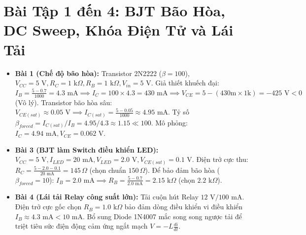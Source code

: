 \documentclass[12pt,a4paper]{report}
\begin{document}
\section{Bài Tập 1 đến 4: BJT Bão Hòa, DC Sweep, Khóa Điện Tử và Lái Tải}
\begin{itemize}
    \item \textbf{Bài 1 (Chế độ bão hòa):} Transistor 2N2222 ($\beta = 100$), $V_{CC} = 5\text{ V}, R_C = 1\text{ k}\Omega, R_B = 1\text{ k}\Omega, V_{in} = 5\text{ V}$.
    Giả thiết khuếch đại: $I_B = \frac{5 - 0.7}{1000} = 4.3\text{ mA} \implies I_C = 100 \times 4.3 = 430\text{ mA} \implies V_{CE} = 5 - (430\text{m} \times 1\text{k}) = -425\text{ V} < 0$ (Vô lý).
    Transistor bão hòa sâu: $V_{CE(sat)} \approx 0.05\text{ V} \implies I_{C(sat)} = \frac{5 - 0.05}{1000} \approx 4.95\text{ mA}$. Tỷ số $\beta_{forced} = I_{C(sat)}/I_B = 4.95/4.3 \approx 1.15 \ll 100$. Mô phỏng: $I_C = 4.94\text{ mA}, V_{CE} = 0.062\text{ V}$.
    \item \textbf{Bài 3 (BJT làm Switch điều khiển LED):} $V_{CC} = 5\text{ V}, I_{LED} = 20\text{ mA}, V_{LED} = 2.0\text{ V}, V_{CE(sat)} = 0.1\text{ V}$.
    Điện trở cực thu: $R_C = \frac{5 - 2.0 - 0.1}{20\text{ mA}} = 145\,\Omega$ (chọn chuẩn $150\,\Omega$).
    Để bảo đảm bão hòa ($\beta_{forced} = 10$): $I_B = 2.0\text{ mA} \implies R_B = \frac{5 - 0.7}{2.0\text{ mA}} = 2.15\text{ k}\Omega$ (chọn $2.2\text{ k}\Omega$).
    \item \textbf{Bài 4 (Lái tải Relay công suất lớn):} Tải cuộn hút Relay $12\text{ V} / 100\text{ mA}$. Điện trở cực gốc chọn $R_B = 1.0\text{ k}\Omega$ bảo đảm dòng điều khiển vi điều khiển $I_B \approx 4.3\text{ mA} < 10\text{ mA}$. Bổ sung Diode 1N4007 mắc song song ngược tải để triệt tiêu sức điện động cảm ứng ngắt mạch $V = -L \frac{di}{dt}$.
\end{itemize}
\end{document}
